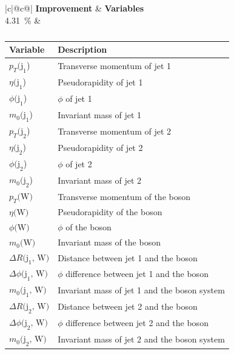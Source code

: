 \begin{table}[h]
    \centering
    \label{tab:app_vars_6}
    \caption{}
    \begin{tabular}{ |c|@{}c@{}| }
        \hline
        \textbf{Improvement} & \textbf{Variables}\\
        \hline
        \SI{4.31}{\%} & 
        \begin{tabular}{ll}
            \hline
            Variable & Description\\
            \hline
            $p_T\text{(j}_\text{1}$) & Transverse momentum of jet 1\\
            $\eta\text{(j}_\text{1}$) & Pseudorapidity of jet 1\\
            $\phi\text{(j}_\text{1}$) & $\phi$ of jet 1\\
            $m_0\text{(j}_\text{1}$) & Invariant mass of jet 1\\

            $p_T\text{(j}_\text{2}$) & Transverse momentum of jet 2\\
            $\eta\text{(j}_\text{2}$) & Pseudorapidity of jet 2\\
            $\phi\text{(j}_\text{2}$) & $\phi$ of jet 2\\
            $m_0\text{(j}_\text{2}$) & Invariant mass of jet 2\\
            
            $p_T\text{(W)}$ & Transverse momentum of the \PW boson\\
            $\eta\text{(W)}$ & Pseudorapidity of the \PW boson\\
            $\phi\text{(W)}$ & $\phi$ of the \PW boson\\
            $m_0\text{(W)}$ & Invariant mass of the \PW boson\\

            $\Delta R(\text{j}_\text{1}\text{, W)}$ & Distance between jet 1 and the \PW boson\\
            $\Delta \phi\text{(j}_\text{1}\text{, W)}$ & $\phi$ difference between jet 1 and the \PW boson\\
            $m_0\text{(j}_\text{1}\text{, W)}$ & Invariant mass of jet 1 and the \PW boson system\\
            
            $\Delta R\text{(j}_\text{2}\text{, W)}$ & Distance between jet 2 and the \PW boson\\
            $\Delta \phi\text{(j}_\text{2}\text{, W)}$ & $\phi$ difference between jet 2 and the \PW boson\\
            $m_0\text{(j}_\text{2}\text{, W)}$ & Invariant mass of jet 2 and the \PW boson system\\
            \hline
        \end{tabular}\\
        \hline
    \end{tabular}
\end{table}

